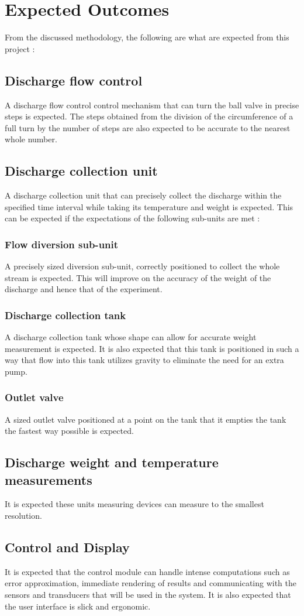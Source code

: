 \section{Expected Outcomes}
From the discussed methodology, the following are what are expected from this project :
\subsection{Discharge flow control}
A discharge flow control control mechanism that can turn the ball valve in precise steps is expected. The steps obtained from the division of the circumference of a full turn by the number of steps are also expected to be accurate to the nearest whole number.
\subsection{Discharge collection unit}
A discharge collection unit that can precisely collect the discharge within the specified time interval while taking its temperature and weight is expected. This can be expected if the expectations of the following sub-units are met :
\subsubsection{Flow diversion sub-unit}
A precisely sized diversion sub-unit, correctly positioned to collect the whole stream is expected. This will improve on the accuracy of the weight of the discharge and hence that of the experiment.
\subsubsection{Discharge collection tank}
A discharge collection tank whose shape can allow for accurate weight measurement is expected. It is also expected that this tank is positioned in such a way that flow into this tank utilizes gravity to eliminate the need for an extra pump.
\subsubsection{Outlet valve}
A sized outlet valve positioned at a point on the tank that it empties the tank the fastest way possible is expected. 
\subsection{Discharge weight and temperature measurements}
It is expected these units measuring devices can measure to the smallest resolution.

\subsection{Control and Display}
It is expected that the control module can handle intense computations such as error approximation, immediate rendering of results and communicating with the sensors and transducers that will be used in the system. It is also expected that the user interface is slick and ergonomic.





